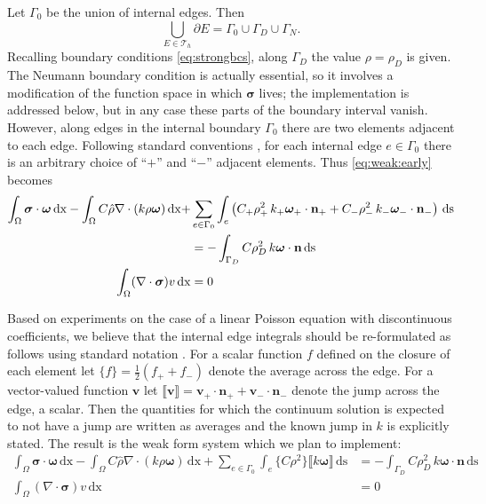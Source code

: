 \documentclass[11pt]{amsart}
\newcommand{\bn}{\mathbf{n}}
\newcommand{\bv}{\mathbf{v}}
\newcommand{\bsigma}{\bm{\sigma}}
\newcommand{\bomega}{\bm{\omega}}
\newcommand{\cT}{\mathcal{T}}
\newcommand{\dx}{\mathrm{dx}}
\newcommand{\ds}{\mathrm{ds}}
\newcommand{\Div}{\nabla\cdot}
\newcommand{\jump}[1]{\llbracket #1 \rrbracket }
\begin{document}
Let $\Gamma_0$ be the union of internal edges.  Then
\begin{equation}
\bigcup_{E\in\cT_h} \partial E = \Gamma_0 \cup \Gamma_D \cup \Gamma_N.
\end{equation}
Recalling boundary conditions \eqref{eq:strongbcs}, along $\Gamma_D$ the value $\rho=\rho_D$ is given.  The Neumann boundary condition is actually essential, so it involves a modification of the function space in which $\bsigma$ lives; the implementation is addressed below, but in any case these parts of the boundary interval vanish.  However, along edges in the internal boundary $\Gamma_0$ there are two elements adjacent to each edge.  Following standard conventions \citep{Arnold2002,Ham2023}, for each internal edge $e\in\Gamma_0$ there is an arbitrary choice of ``$+$'' and ``$-$'' adjacent elements.  Thus \eqref{eq:weak:early} becomes
\begin{subequations}
\label{eq:weak:second}
\begin{align}
\int_\Omega \bsigma\cdot \bomega\,\dx - \int_\Omega C \hat\rho \Div(k\rho\bomega)\,\dx + &\sum_{e\in\Gamma_0} \int_e \left(C_+ \rho_+^2 \, k_+ \bomega_+\cdot\bn_+ + C_- \rho_-^2 \, k_- \bomega_-\cdot\bn_-\right)\,\ds \label{eq:weak:second:darcy} \\
   &= -\int_{\Gamma_D} C \rho_D^2 \, k \bomega\cdot\bn\,\ds \notag \\
\int_\Omega (\Div \bsigma) v\,\dx &= 0 \label{eq:weak:second:masscont}
\end{align}
\end{subequations}

Based on experiments on the case of a linear Poisson equation with discontinuous coefficients, we believe that the internal edge integrals should be re-formulated as follows using standard notation \citep{Arnold2002}.  For a scalar function $f$ defined on the closure of each element let $\{f\} = \frac{1}{2} (f_+ + f_-)$ denote the average across the edge.  For a vector-valued function $\bv$ let $\jump{\bv} = \bv_+ \cdot \bn_+ + \bv_- \cdot \bn_-$ denote the jump across the edge, a scalar.  Then the quantities for which the continuum solution is expected to not have a jump are written as averages and the known jump in $k$ is explicitly stated.  The result is the weak form system which we plan to implement: 
\begin{subequations}
\label{eq:weak}
\begin{align}
\int_\Omega \bsigma\cdot \bomega\,\dx - \int_\Omega C \hat\rho \Div(k\rho\bomega)\,\dx + \sum_{e\in\Gamma_0} \int_e \{C \rho^2\} \jump{k \bomega}\,\ds &= -\int_{\Gamma_D} C \rho_D^2 \, k \bomega\cdot\bn\,\ds \label{eq:weak:darcy} \\
\int_\Omega (\Div \bsigma) v\,\dx &= 0 \label{eq:weak:masscont}
\end{align}
\end{subequations}
\end{document}
